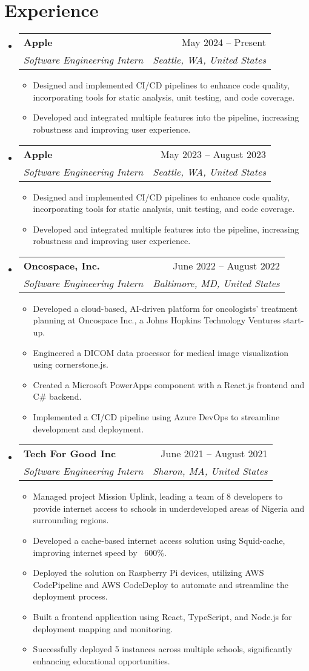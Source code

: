 \documentclass[letterpaper,12pt]{extarticle}
\makeatletter
\newcommand{\resumeItem}[1]{
  \item\small{
    {#1 \vspace{-2pt}}
  }
}
\newcommand{\resumeSubheading}[4]{
  \vspace{-1pt}\item
    \begin{tabular*}{0.97\textwidth}[t]{l@{\extracolsep{\fill}}r}
      \textbf{#1} & \small #2 \\
      \textit{\small #3} & \textit{\small #4} \\
    \end{tabular*}\vspace{-7pt}
}
\newcommand{\resumeSubHeadingListStart}{\begin{itemize}[leftmargin=0.15in, label={}]}
\newcommand{\resumeSubHeadingListEnd}{\end{itemize}}
\newcommand{\resumeItemListStart}{
    \begin{itemize}
    \itemsep 2pt
}
\newcommand{\resumeItemListEnd}{\end{itemize}\vspace{-5pt}}
\makeatother
\begin{document}
\section{Experience}
\resumeSubHeadingListStart
\resumeSubheading
{Apple}{May 2024 -- Present}
{Software Engineering Intern}{Seattle, WA, United States}
\resumeItemListStart
\resumeItem{Designed and implemented CI/CD pipelines to enhance code quality, incorporating tools for static analysis, unit testing, and code coverage.}
\resumeItem{Developed and integrated multiple features into the pipeline, increasing robustness and improving user experience.}
\resumeItemListEnd
\resumeSubheading
{Apple}{May 2023 -- August 2023}
{Software Engineering Intern}{Seattle, WA, United States}
\resumeItemListStart
\resumeItem{Designed and implemented CI/CD pipelines to enhance code quality, incorporating tools for static analysis, unit testing, and code coverage.}
\resumeItem{Developed and integrated multiple features into the pipeline, increasing robustness and improving user experience.}
\resumeItemListEnd
\resumeSubheading
{Oncospace, Inc.}{June 2022 -- August 2022}
{Software Engineering Intern}{Baltimore, MD, United States}
\resumeItemListStart
\resumeItem{Developed a cloud-based, AI-driven platform for oncologists’ treatment planning at Oncospace Inc., a Johns Hopkins Technology Ventures start-up.}
\resumeItem{Engineered a DICOM data processor for medical image visualization using cornerstone.js.}
\resumeItem{Created a Microsoft PowerApps component with a React.js frontend and C\# backend.}
\resumeItem{Implemented a CI/CD pipeline using Azure DevOps to streamline development and deployment.}
\resumeItemListEnd
\resumeSubheading
{Tech For Good Inc}{June 2021 -- August 2021}
{Software Engineering Intern}{Sharon, MA, United States}
\resumeItemListStart
\resumeItem{Managed project Mission Uplink, leading a team of 8 developers to provide internet access to schools in underdeveloped areas of Nigeria and surrounding regions.}
\resumeItem{Developed a cache-based internet access solution using Squid-cache, improving internet speed by ~600\%.}
\resumeItem{Deployed the solution on Raspberry Pi devices, utilizing AWS CodePipeline and AWS CodeDeploy to automate and streamline the deployment process.}
\resumeItem{Built a frontend application using React, TypeScript, and Node.js for deployment mapping and monitoring.}
\resumeItem{Successfully deployed 5 instances across multiple schools, significantly enhancing educational opportunities.}
\resumeItemListEnd
\resumeSubHeadingListEnd
\end{document}
